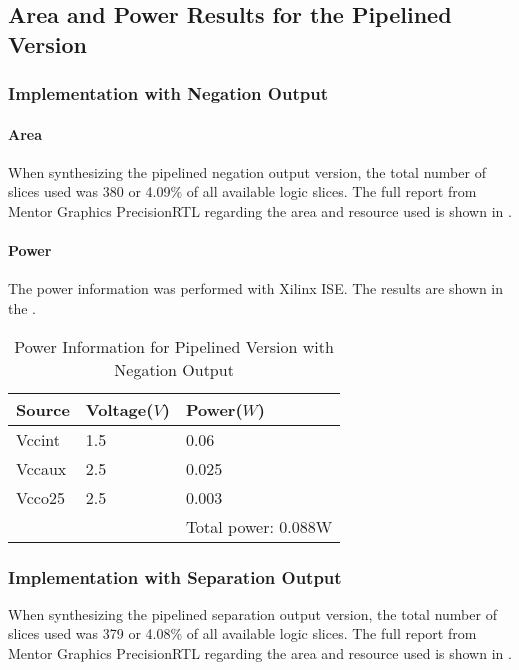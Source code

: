 \subsection{Area and Power Results for the Pipelined Version}
\subsubsection{Implementation with Negation Output}
\paragraph{Area}
When synthesizing the pipelined negation output version, the total number of slices used was 380 or 4.09\% 
of all available logic slices. The full report from Mentor Graphics PrecisionRTL regarding the area
and resource used is shown in .

\paragraph{Power}
The power information was performed with Xilinx ISE. The results are shown in the .

\begin{table}[!ht]
	\renewcommand{\arraystretch}{1.3}
	\caption{Power Information for Pipelined Version with Negation Output}
	\centering
	\begin{tabular}{ p{4cm} p{4cm} p{4cm} }
		\hline
		\bfseries Source & \bfseries Voltage(\(V\)) & \bfseries Power(\(W\)) \\
		\hline
		Vccint           & 1.5                      & 0.06                   \\
		Vccaux           & 2.5                      & 0.025                  \\
		Vcco25           & 2.5                      & 0.003                  \\
		\hline
		                 &                          & Total power: 0.088W    \\
	\end{tabular}
	\label{tb:p__neg_power}
\end{table}

\subsubsection{Implementation with Separation Output}

When synthesizing the pipelined separation output version, the total number of slices used was 379 or 4.08\% 
of all available logic slices. The full report from Mentor Graphics PrecisionRTL regarding the area
and resource used is shown in .

